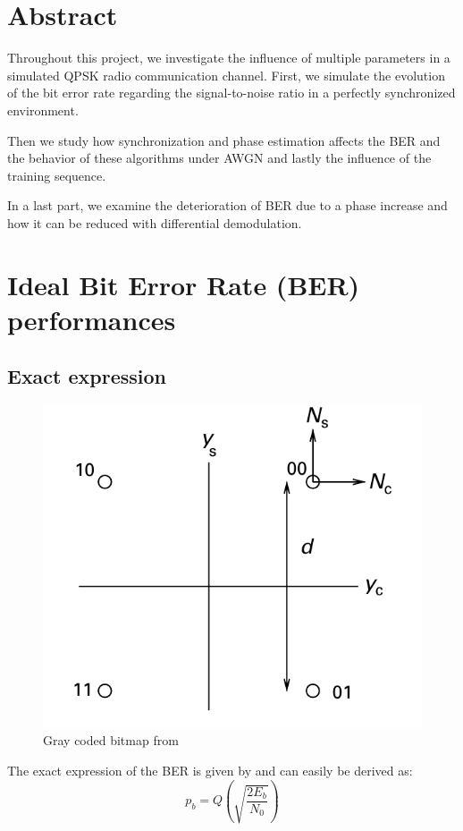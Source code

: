 \documentclass[a4paper,12pt]{article}
\begin{document}

\newpage

\section*{Abstract}
Throughout this project, we investigate the influence of multiple parameters in a simulated QPSK radio communication channel.
First, we simulate the evolution of the bit error rate regarding the signal-to-noise ratio in a perfectly synchronized environment. 

Then we study how synchronization and phase estimation affects the BER and the behavior of these algorithms under AWGN and lastly the influence of the training sequence.

In a last part, we examine the deterioration of BER due to a phase increase and how it can be reduced with differential demodulation.

\section{Ideal Bit Error Rate (BER) performances}

\subsection{Exact expression}
\begin{figure}[ht!]
\centering
\begin{center}
\includegraphics[scale=0.20]{Gray_coded_QPSK.png}
\caption{Gray coded bitmap from \cite{Madhow}}
\end{center}
\end{figure}
The exact expression of the BER is given by \cite{Madhow} and can easily be derived as:
\begin{equation}
p_{b}=Q(\sqrt{\frac{2E_{b}}{N_{0}}})
\end{equation}
\end{document}
